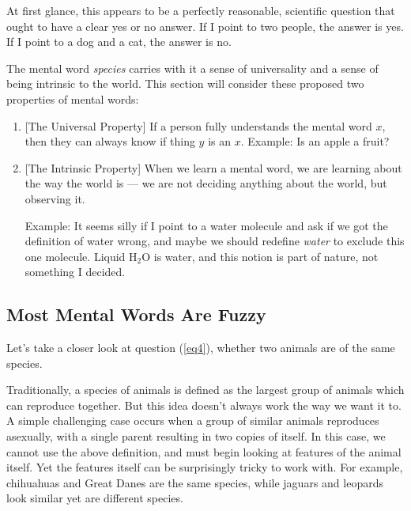 \documentclass[11pt, oneside]{article}   	%
\begin{document}
At first glance, this appears to be a perfectly reasonable, scientific question
that ought to have a clear yes or no answer. If I point to two people, the
answer is yes. If I point to a dog and a cat, the answer is no.

The mental word {\em species} carries with it a sense of universality and a
sense of being intrinsic to the world.
This section will consider
these proposed two properties of mental words:
\begin{enumerate}
    \item{} [The Universal Property]
        If a person fully understands the mental word $x$,
        then they can always know if thing $y$ is an $x$.
        Example: Is an apple a fruit?
    \item{} [The Intrinsic Property]
        When we learn a mental word, we are learning about the way the world
        is --- we are not deciding anything about the world, but observing it.

        Example: It seems silly if I point to a water molecule and ask if we got
        the definition of water wrong, and maybe we should redefine {\em water}
        to exclude this one molecule.
        Liquid H$_2$O is water, and this notion is part
        of nature, not something I decided.
\end{enumerate}





\subsection{Most Mental Words Are Fuzzy}

Let's take a closer look at question (\ref{eq4}), whether two animals are of the
same species.

Traditionally, a species of animals is defined as the largest group of animals
which can reproduce together. But this idea doesn't always work the way we want
it to. A simple challenging case occurs when a group of similar animals
reproduces asexually, with a single parent resulting in two copies of itself. In
this case, we cannot use the above definition, and must begin looking at
features of the animal itself. Yet the features itself can be surprisingly
tricky to work with. For example, chihuahuas and Great Danes are the same
species, while jaguars and leopards look similar yet are different species.
\end{document}
